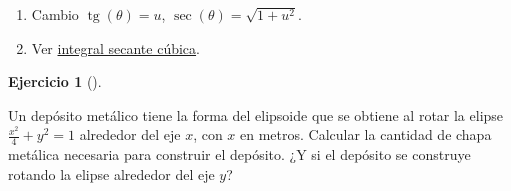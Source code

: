 \documentclass[
  a4paper,
]{scrreport}
\providecommand{\tightlist}{%
  \setlength{\itemsep}{0pt}\setlength{\parskip}{0pt}}\usepackage{longtable,booktabs,array}
\theoremstyle{definition}
\newtheorem{exercise}{Ejercicio}[chapter]
\theoremstyle{remark}
\begin{document}
\begin{tcolorbox}
\begin{enumerate}
  \begin{enumerate}
  \def\labelenumii{(\arabic{enumii})}
  \tightlist
  \item
    Cambio \(\operatorname{tg}(\theta)=u\),
    \(\sec(\theta)=\sqrt{1+u^2}\).\\
  \item
    Ver
    \href{https://es.wikipedia.org/wiki/Integral_de_la_secante_c\%C3\%BAbica}{integral
    secante cúbica}.
  \end{enumerate}
\end{enumerate}

\end{tcolorbox}

\begin{exercise}[]\protect\hypertarget{exr-superficie-deposito}{}\label{exr-superficie-deposito}

Un depósito metálico tiene la forma del elipsoide que se obtiene al
rotar la elipse \(\frac{x^2}{4}+y^2=1\) alrededor del eje \(x\), con
\(x\) en metros. Calcular la cantidad de chapa metálica necesaria para
construir el depósito. ¿Y si el depósito se construye rotando la elipse
alrededor del eje \(y\)?

\end{exercise}
\end{document}
